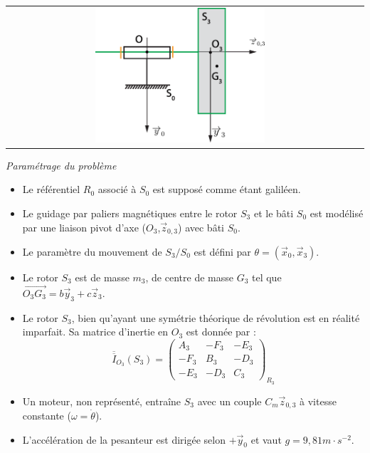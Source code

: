 \documentclass[10pt,fleqn]{article} %
\begin{document}
\begin{center}
\begin{tabular}{cc}
\includegraphics[width=0.5\textwidth]{images/figure_presentation.pdf}&
\end{tabular}
\end{center}
\textit{Paramétrage du problème}



\begin{itemize}
\item Le référentiel $R_0$ associé à $S_0$ est supposé comme étant galiléen.
\item Le guidage par paliers magnétiques entre le rotor $S_3$ et le bâti $S_0$ est modélisé par une liaison pivot d'axe ($O_3$,$\overrightarrow{z}_{0,3}$) avec bâti $S_0$.
\item Le paramètre du mouvement de $S_3/S_0$ est défini par $\theta=(\overrightarrow{x}_0,\overrightarrow{x}_3)$.
\item Le rotor $S_3$ est de masse $m_3$, de centre de masse $G_3$ tel que $\overrightarrow{O_3G_3}=b \overrightarrow{y}_3+c\overrightarrow{z}_3$.
\item Le rotor $S_3$, bien qu'ayant une symétrie théorique de révolution est en réalité imparfait. Sa matrice d'inertie en $O_3$ est donnée par :
$$
\overline{\overline{I}}_{O_3}(S_3)=\left(\begin{array}{ccc}
A_3 & -F_3 & -E_3 \\ 
-F_3 & B_3 & -D_3 \\ 
-E_3 & -D_3 & C_3
\end{array} \right)_{R_3}
$$
\item Un moteur, non représenté, entraîne $S_3$ avec un couple $C_m \overrightarrow{z}_{0,3}$ à vitesse constante ($\omega=\dot{\theta}$).
\item L'accélération de la pesanteur est dirigée selon $+\overrightarrow{y}_0$ et vaut $g=9,81m\cdot s^{-2}$.
\end{itemize}
\end{document}
